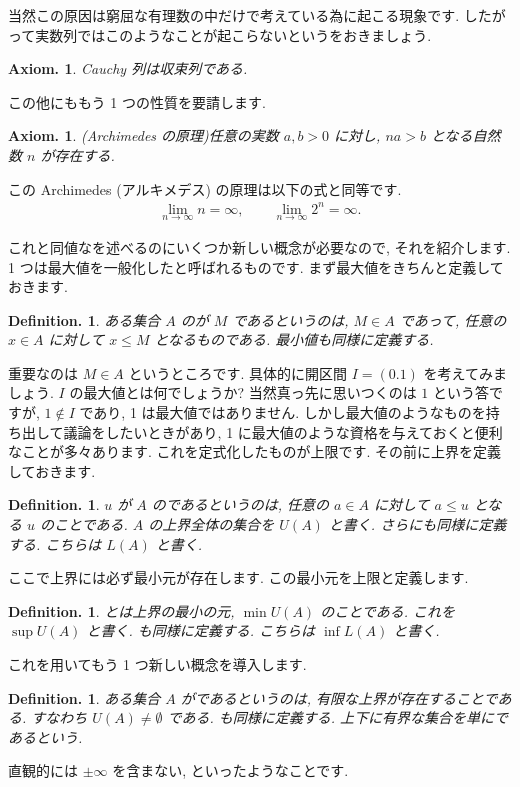 \documentclass[openany, a4paper, oneside]{book}
\theoremstyle{break}
\newtheorem{axm}[thm]{Axiom.}
\theoremstyle{breakdefn}
\newtheorem{defn}[thm]{Definition.}
\begin{document}
当然この原因は窮屈な有理数の中だけで考えている為に起こる現象です.
したがって実数列ではこのようなことが起こらないというをおきましょう.
    \begin{axm}Cauchy 列は収束列である.
    \end{axm}
この他にももう 1 つの性質を要請します.
    \begin{axm}(Archimedes の原理)任意の実数 $a,b>0$ に対し,  $na>b$ となる自然数 $n$ が存在する.
    \end{axm}
この Archimedes (アルキメデス) の原理は以下の式と同等です.
    \begin{align}
        \lim_{n\to\infty}n=\infty,
        \qquad
        \lim_{n\to\infty}2^n=\infty.
    \end{align}

これと同値なを述べるのにいくつか新しい概念が必要なので, それを紹介します.
1 つは最大値を一般化したと呼ばれるものです.
まず最大値をきちんと定義しておきます.
\begin{defn}
ある集合 $A$ のが $M$ であるというのは,  $M\in A$ であって,
任意の $x\in A$ に対して $x\leq M$ となるものである. 最小値も同様に定義する.
\end{defn}
重要なのは $M\in A$ というところです.
具体的に開区間 $I=(0.1)$ を考えてみましょう.
 $I$ の最大値とは何でしょうか?
当然真っ先に思いつくのは $1$ という答ですが,  $1\notin I$ であり, 1 は最大値ではありません.
しかし最大値のようなものを持ち出して議論をしたいときがあり,
1 に最大値のような資格を与えておくと便利なことが多々あります.
これを定式化したものが上限です.
その前に上界を定義しておきます.
\begin{defn}
$u$ が $A$ のであるというのは, 任意の $a\in A$ に対して $a\leq u$ となる $u$ のことである.
$A$ の上界全体の集合を $U (A)$ と書く.
さらにも同様に定義する. こちらは $L (A)$ と書く.
\end{defn}
ここで上界には必ず最小元が存在します.
この最小元を上限と定義します.
\begin{defn}
とは上界の最小の元,  $\min U (A)$ のことである.
これを $\sup U (A)$ と書く.
も同様に定義する. こちらは $\inf L (A)$ と書く.
\end{defn}
これを用いてもう 1 つ新しい概念を導入します.
\begin{defn}
ある集合 $A$ がであるというのは, 有限な上界が存在することである.
すなわち $U (A)\not=\emptyset$ である. も同様に定義する.
上下に有界な集合を単にであるという.
\end{defn}
直観的には $\pm\infty$ を含まない, といったようなことです.
\end{document}
